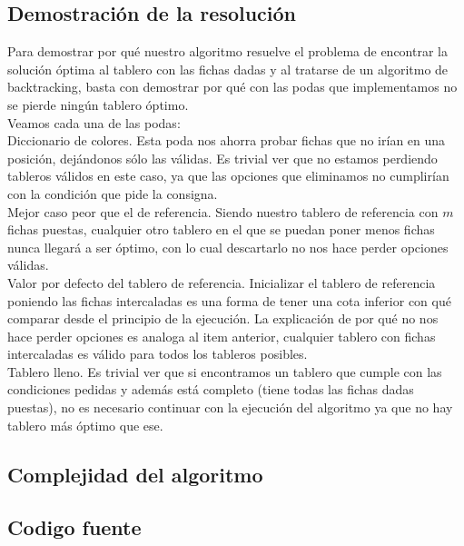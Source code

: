 \subsection{Demostraci\'on de la resoluci\'on}

Para demostrar por qu\'e nuestro algoritmo resuelve el problema de encontrar la soluci\'on \'optima al tablero con las fichas dadas y al tratarse de un algoritmo de backtracking, basta con demostrar por qu\'e con las podas que implementamos no se pierde ning\'un tablero \'optimo.\\

Veamos cada una de las podas:\\

Diccionario de colores. Esta poda nos ahorra probar fichas que no ir\'ian en una posici\'on, dej\'andonos s\'olo las v\'alidas. Es trivial ver que no estamos perdiendo tableros v\'alidos en este caso, ya que las opciones que eliminamos no cumplir\'ian con la condici\'on que pide la consigna.\\

Mejor caso peor que el de referencia. Siendo nuestro tablero de referencia con $m$ fichas puestas, cualquier otro tablero en el que se puedan poner menos fichas nunca llegar\'a a ser \'optimo, con lo cual descartarlo no nos hace perder opciones v\'alidas.\\

Valor por defecto del tablero de referencia. Inicializar el tablero de referencia poniendo las fichas intercaladas es una forma de tener una cota inferior con qu\'e comparar desde el principio de la ejecuci\'on. La explicaci\'on de por qu\'e no nos hace perder opciones es analoga al item anterior, cualquier tablero con fichas intercaladas es v\'alido para todos los tableros posibles. \\

Tablero lleno. Es trivial ver que si encontramos un tablero que cumple con las condiciones pedidas y adem\'as est\'a completo (tiene todas las fichas dadas puestas), no es necesario continuar con la ejecuci\'on del algoritmo ya que no hay tablero m\'as \'optimo que ese.\\

\subsection{Complejidad del algoritmo}

\newpage

\subsection{Codigo fuente}

